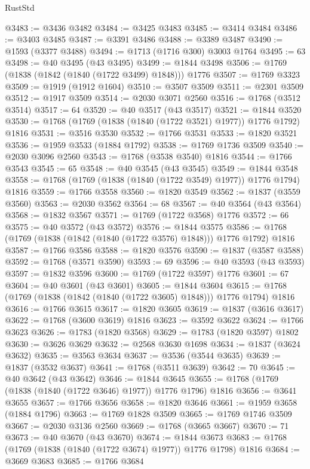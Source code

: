 \begin{lexlean}{RustStd}
\begin{coremodule}
{\begin{coremodule}
{{{{{{{{{{{{{{{{{{{{{{{{{{{{{{{{{{{{{{{{{{{{{{{@3483 := @3436 @3482
@3484 := @3425 @3483
@3485 := @3414 @3484
@3486 := @3403 @3485
@3487 := @3391 @3486
@3488 := @3389 @3487
@3490 := @1593 (@3377 @3488)
@3494 := @1713 (@1716 @300) @3003 @1764
@3495 := 63
@3498 := @40 @3495 (@43 @3495)
@3499 := @1844 @3498
@3506 := @1769 (@1838 (@1842 (@1840 (@1722 @3499) @1848))) @1776
@3507 := @1769 @3323
@3509 := @1919 (@1912 @1604)
@3510 := @3507 @3509
@3511 := @2301 @3509
@3512 := @1917 @3509
@3514 := @2030 @3071 @2560
@3516 := @1768 (@3512 @3514)
@3517 := 64
@3520 := @40 @3517 (@43 @3517)
@3521 := @1844 @3520
@3530 := @1768 (@1769 (@1838 (@1840 (@1722 @3521) @1977)) @1776 @1792) @1816
@3531 := @3516 @3530
@3532 := @1766 @3531
@3533 := @1820 @3521
@3536 := @1959 @3533 (@1884 @1792)
@3538 := @1769 @1736 @3509
@3540 := @2030 @3096 @2560
@3543 := @1768 (@3538 @3540) @1816
@3544 := @1766 @3543
@3545 := 65
@3548 := @40 @3545 (@43 @3545)
@3549 := @1844 @3548
@3558 := @1768 (@1769 (@1838 (@1840 (@1722 @3549) @1977)) @1776 @1794) @1816
@3559 := @1766 @3558
@3560 := @1820 @3549
@3562 := @1837 (@3559 @3560)
@3563 := @2030 @3562
@3564 := 68
@3567 := @40 @3564 (@43 @3564)
@3568 := @1832 @3567
@3571 := @1769 (@1722 @3568) @1776
@3572 := 66
@3575 := @40 @3572 (@43 @3572)
@3576 := @1844 @3575
@3586 := @1768 (@1769 (@1838 (@1842 (@1840 (@1722 @3576) @1848))) @1776 @1792) @1816
@3587 := @1766 @3586
@3588 := @1820 @3576
@3590 := @1837 (@3587 @3588)
@3592 := @1768 (@3571 @3590)
@3593 := 69
@3596 := @40 @3593 (@43 @3593)
@3597 := @1832 @3596
@3600 := @1769 (@1722 @3597) @1776
@3601 := 67
@3604 := @40 @3601 (@43 @3601)
@3605 := @1844 @3604
@3615 := @1768 (@1769 (@1838 (@1842 (@1840 (@1722 @3605) @1848))) @1776 @1794) @1816
@3616 := @1766 @3615
@3617 := @1820 @3605
@3619 := @1837 (@3616 @3617)
@3622 := @1768 (@3600 @3619) @1816
@3623 := @3592 @3622
@3624 := @1766 @3623
@3626 := @1783 (@1820 @3568)
@3629 := @1783 (@1820 @3597) @1802
@3630 := @3626 @3629
@3632 := @2568 @3630 @1698
@3634 := @1837 (@3624 @3632)
@3635 := @3563 @3634
@3637 := @3536 (@3544 @3635)
@3639 := @1837 (@3532 @3637)
@3641 := @1768 (@3511 @3639)
@3642 := 70
@3645 := @40 @3642 (@43 @3642)
@3646 := @1844 @3645
@3655 := @1768 (@1769 (@1838 (@1840 (@1722 @3646) @1977)) @1776 @1796) @1816
@3656 := @3641 @3655
@3657 := @1766 @3656
@3658 := @1820 @3646
@3661 := @1959 @3658 (@1884 @1796)
@3663 := @1769 @1828 @3509
@3665 := @1769 @1746 @3509
@3667 := @2030 @3136 @2560
@3669 := @1768 (@3665 @3667)
@3670 := 71
@3673 := @40 @3670 (@43 @3670)
@3674 := @1844 @3673
@3683 := @1768 (@1769 (@1838 (@1840 (@1722 @3674) @1977)) @1776 @1798) @1816
@3684 := @3669 @3683
@3685 := @1766 @3684
}}}}}}}}}}}}}}}}}}}}}}}}}}}}}}}}}}}}}}}}}}}}}}}
\end{coremodule}}
\end{coremodule}
\end{lexlean}
